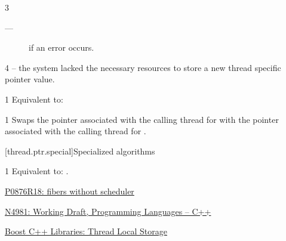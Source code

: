 \documentclass[fontsize=10pt,paper=A4,pagesize,DIV=15]{scrartcl}
\begin{document}
3 \except
\begin{description}
    \item[---]  if an error occurs.
\end{description}

4 \errors
{} -- the system lacked the necessary
resources to store a new thread specific pointer value.


1 \effects
Equivalent to: 


1 \effects
Swaps the pointer associated with the calling thread for \this with the
pointer associated with the calling thread for .

[thread.ptr.special]{Specialized algorithms}

1 \effects
Equivalent to: .

\cbend






\newpage
{}
\begin{thebibliography}{99}

        \href{https://www.open-std.org/jtc1/sc22/wg21/docs/papers/2024/p0876r18.pdf}
        {P0876R18: fibers without scheduler}

        \href{https://www.open-std.org/jtc1/sc22/wg21/docs/papers/2024/n4981.pdf}
        {N4981: Working Draft, Programming Languages -- C++}

        \href{https://www.boost.org/doc/libs/release/doc/html/thread/thread_local_storage.html}
        {Boost C++ Libraries: Thread Local Storage}

\end{thebibliography}

\end{document}
